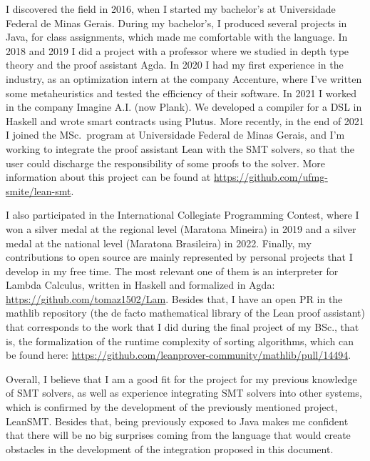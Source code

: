\documentclass[a4paper,12pt]{article}
\begin{document}
I discovered the field in 2016, when I started my bachelor's at Universidade Federal de Minas Gerais. During my bachelor's, I produced several projects in Java, for class assignments, which made me comfortable with the language. In 2018 and 2019 I did a project with a professor where we studied in depth type theory and the proof assistant Agda. In 2020 I had my first experience in the industry, as an optimization intern at the company Accenture, where I've written some metaheuristics and tested the efficiency of their software. In 2021 I worked in the company Imagine A.I. (now Plank). We developed a compiler for a DSL in Haskell and wrote smart contracts using Plutus. More recently, in the end of 2021 I joined the MSc.\ program at Universidade Federal de Minas Gerais, and I'm working to integrate the proof assistant Lean with the SMT solvers, so that the user could discharge the responsibility of some proofs to the solver. More information about this project can be found at \url{https://github.com/ufmg-smite/lean-smt}.

I also participated in the International Collegiate Programming Contest, where I won a silver medal at the regional level (Maratona Mineira) in 2019 and a silver medal at the national level (Maratona Brasileira) in 2022. Finally, my contributions to open source are mainly represented by personal projects that I develop in my free time. The most relevant one of them is an interpreter for Lambda Calculus, written in Haskell and formalized in Agda: \url{https://github.com/tomaz1502/Lam}. Besides that, I have an open PR in the mathlib repository (the de facto mathematical library of the Lean proof assistant) that corresponds to the work that I did during the final project of my BSc., that is, the formalization of the runtime complexity of sorting algorithms, which can be found here: \url{https://github.com/leanprover-community/mathlib/pull/14494}.

Overall, I believe that I am a good fit for the project for my previous knowledge of SMT solvers, as well as experience integrating SMT solvers into other systems, which is confirmed by the development of the previously mentioned project, LeanSMT. Besides that, being previously exposed to Java makes me confident that there will be no big surprises coming from the language that would create obstacles in the development of the integration proposed in this document.


\end{document}
